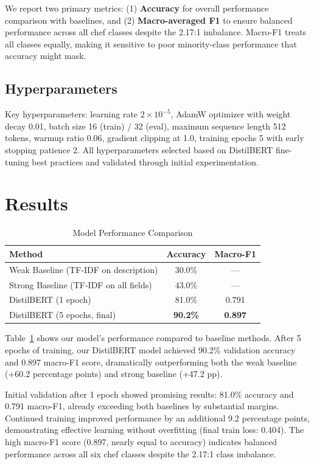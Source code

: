 \documentclass[twocolumn,10pt]{article}
\begin{document}
We report two primary metrics: (1) \textbf{Accuracy} for overall performance comparison with baselines, and (2) \textbf{Macro-averaged F1} to ensure balanced performance across all chef classes despite the 2.17:1 imbalance. Macro-F1 treats all classes equally, making it sensitive to poor minority-class performance that accuracy might mask.

\subsection{Hyperparameters}

Key hyperparameters: learning rate $2 \times 10^{-5}$, AdamW optimizer with weight decay 0.01, batch size 16 (train) / 32 (eval), maximum sequence length 512 tokens, warmup ratio 0.06, gradient clipping at 1.0, training epochs 5 with early stopping patience 2. All hyperparameters selected based on DistilBERT fine-tuning best practices and validated through initial experimentation.

\section{Results}

\begin{table}[h]
\centering
\caption{Model Performance Comparison}
\begin{tabular}{lcc}
\hline
\textbf{Method} & \textbf{Accuracy} & \textbf{Macro-F1} \\
\hline
Weak Baseline (TF-IDF on description) & 30.0\% & --- \\
Strong Baseline (TF-IDF on all fields) & 43.0\% & --- \\
\hline
DistilBERT (1 epoch) & 81.0\% & 0.791 \\
DistilBERT (5 epochs, final) & \textbf{90.2\%} & \textbf{0.897} \\
\hline
\end{tabular}
\label{tab:results}
\end{table}

Table~\ref{tab:results} shows our model's performance compared to baseline methods. After 5 epochs of training, our DistilBERT model achieved 90.2\% validation accuracy and 0.897 macro-F1 score, dramatically outperforming both the weak baseline (+60.2 percentage points) and strong baseline (+47.2 pp).

Initial validation after 1 epoch showed promising results: 81.0\% accuracy and 0.791 macro-F1, already exceeding both baselines by substantial margins. Continued training improved performance by an additional 9.2 percentage points, demonstrating effective learning without overfitting (final train loss: 0.404). The high macro-F1 score (0.897, nearly equal to accuracy) indicates balanced performance across all six chef classes despite the 2.17:1 class imbalance.
\end{document}

